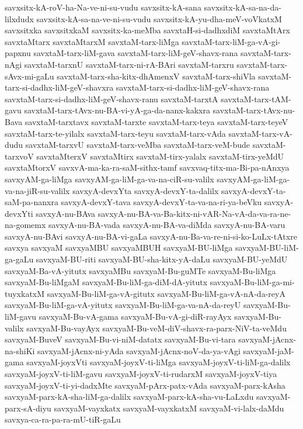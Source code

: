{savxsitx-kA-roV-ha-Na-ve-ni-su-vudu
savxsitx-kA-sana
savxsitx-kA-sa-na-da-lilxdudx
savxsitx-kA-sa-na-ve-ni-su-vudu
savxsitx-kA-yu-dha-meV-voVkatxM
savxsitxka
savxsitxkaM
savxsitx-ka-meMba
savxtaH-si-dadhxdiM
savxtaMtArx
savxtaMtarx
savxtaMtarxM
savxtaM-tarx-liMga
savxtaM-tarx-liM-ga-vA-gi-papxnu
savxtaM-tarx-liM-gava
savxtaM-tarx-liM-geV-shavx-rana
savxtaM-tarx-nAgi
savxtaM-tarxnU
savxtaM-tarx-ni-rA-BAri
savxtaM-tarxru
savxtaM-tarx-sAvx-mi-gaLu
savxtaM-tarx-sha-kitx-dhAmenxV
savxtaM-tarx-shiVla
savxtaM-tarx-si-dadhx-liM-geV-shavxra
savxtaM-tarx-si-dadhx-liM-geV-shavx-rana
savxtaM-tarx-si-dadhx-liM-geV-shavx-ranu
savxtaM-tarxtA
savxtaM-tarx-tAM-gavu
savxtaM-tarx-tAvx-nu-BA-vi-yA-ga-da-nanx-kakxra
savxtaM-tarx-tAvx-nu-Bava
savxtaM-tarxtavx
savxtaM-tarxte
savxtaM-tarx-teya
savxtaM-tarx-teyeV
savxtaM-tarx-te-yilalx
savxtaM-tarx-teyu
savxtaM-tarx-vAda
savxtaM-tarx-vA-dudu
savxtaM-tarxvU
savxtaM-tarx-veMba
savxtaM-tarx-veM-bude
savxtaM-tarxvoV
savxtaMterxV
savxtaMtirx
savxtaM-tirx-yalalx
savxtaM-tirx-yeMdU
savxtaMtorxV
savxvA-ma-ka-ra-saM-sithx-tamf
savxvaq-titx-ma-Bi-pa-nAnxya
savxyAM-ga-liMga
savxyAM-ga-liM-ga-va-na-ciR-su-valilx
savxyAM-ga-liM-ga-va-na-jiR-su-valilx
savxyA-devxYta
savxyA-devxY-ta-dalilx
savxyA-devxY-ta-saM-pa-nanxra
savxyA-devxY-tava
savxyA-devxY-ta-va-na-ri-ya-beVku
savxyA-devxYti
savxyA-nu-BAva
savxyA-nu-BA-va-Ba-kitx-ni-vAR-Na-vA-da-va-ra-ne-na-gomemx
savxyA-nu-BA-vada
savxyA-nu-BA-va-diMda
savxyA-nu-BA-varu
savxyA-nu-BAvi
savxyA-nu-BA-vi-gaLa
savxyA-nu-Ba-va-re-ni-si-ko-LuLx-tAtxre
savxya
savxyaM
savxyaMBU
savxyaMBUH
savxyaM-BU-liMga
savxyaM-BU-liM-ga-gaLu
savxyaM-BU-riti
savxyaM-BU-sha-kitx-yA-daLu
savxyaM-BU-yeMdU
savxyaM-Ba-vA-yitutx
savxyaMBu
savxyaM-Bu-guMTe
savxyaM-Bu-liMga
savxyaM-Bu-liMgaM
savxyaM-Bu-liM-ga-diM-dA-yitutx
savxyaM-Bu-liM-ga-mi-tuyxkatxM
savxyaM-Bu-liM-ga-vA-gitutx
savxyaM-Bu-liM-ga-vA-nA-da-reyA
savxyaM-Bu-liM-ga-vA-yitutx
savxyaM-Bu-liM-ga-va-nA-da-reyU
savxyaM-Bu-liM-gavu
savxyaM-Bu-vA-gama
savxyaM-Bu-vA-gi-diR-rayAyx
savxyaM-Bu-valilx
savxyaM-Bu-vayAyx
savxyaM-Bu-veM-diV-shavx-ra-parx-NiV-ta-veMdu
savxyaM-BuveV
savxyaM-Bu-vi-niM-datatx
savxyaM-Bu-vi-tara
savxyaM-jAcnx-na-shiKi
savxyaM-jAcnx-ni-yAda
savxyaM-jAcnx-noV-da-ya-vAgi
savxyaM-jaM-gama
savxyaM-joyxVti
savxyaM-joyxV-ti-liMga
savxyaM-joyxV-ti-liM-ga-dalilx
savxyaM-joyxV-ti-liM-gavu
savxyaM-joyxV-ti-rudarxM
savxyaM-joyxV-tiya
savxyaM-joyxV-ti-yi-dadxMte
savxyaM-pArx-patx-vAda
savxyaM-parx-kAsha
savxyaM-parx-kA-sha-liM-ga-dalilx
savxyaM-parx-kA-sha-vu-LaLxdu
savxyaM-parx-sA-diyu
savxyaM-vayxkatx
savxyaM-vayxkatxM
savxyaM-vi-lalx-daMdu
savxya-ca-ra-pa-ra-mU-tiR-gaLu
}
